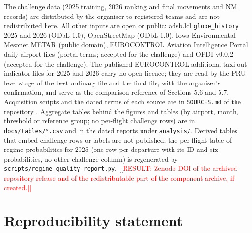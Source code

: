 \documentclass[
  manuscript=article,  %
  layout=preprint,     %
  year=2026,
  volume=4,
]{extra/joas}
\newcommand{\placeholder}[1]{\textcolor{red}{[[RESULT:#1]]}}
\begin{document}
The challenge data (2025 training, 2026 ranking and final movements and NM records) are distributed by the organiser to registered teams and are not redistributed here. All other inputs are open or public: adsb.lol \texttt{globe\_\allowbreak{}history} 2025 and 2026 (ODbL 1.0), OpenStreetMap (ODbL 1.0), Iowa Environmental Mesonet METAR (public domain), EUROCONTROL Aviation Intelligence Portal daily airport files (portal terms; accepted for the challenge) and OPDI v0.0.2 (accepted for the challenge). The published EUROCONTROL additional taxi-out indicator files for 2025 and 2026 \autocite{eurocontrol2026atxotdata} carry no open licence; they are read by the PRU level stage of the best ordinary file and the final file, with the organiser's confirmation, and serve as the comparison reference of Sections 5.6 and 5.7. Acquisition scripts and the dated terms of each source are in \texttt{SOURCES.md} of the repository \autocite{kolomiiets2026repo}. Aggregate tables behind the figures and tables (by airport, month, threshold or reference group; no per-flight challenge rows) are in \texttt{docs/\allowbreak{}tables/\allowbreak{}*.csv} and in the dated reports under \texttt{analysis/\allowbreak{}}. Derived tables that embed challenge rows or labels are not published; the per-flight table of regime probabilities for 2025 (one row per departure with its ID and six probabilities, no other challenge column) is regenerated by \texttt{scripts/\allowbreak{}regime\_\allowbreak{}quality\_\allowbreak{}report.py}. \placeholder{ Zenodo DOI of the archived repository release and of the redistributable part of the component archive, if created.}

\section*{Reproducibility statement}\label{reproducibility-statement}
\end{document}

